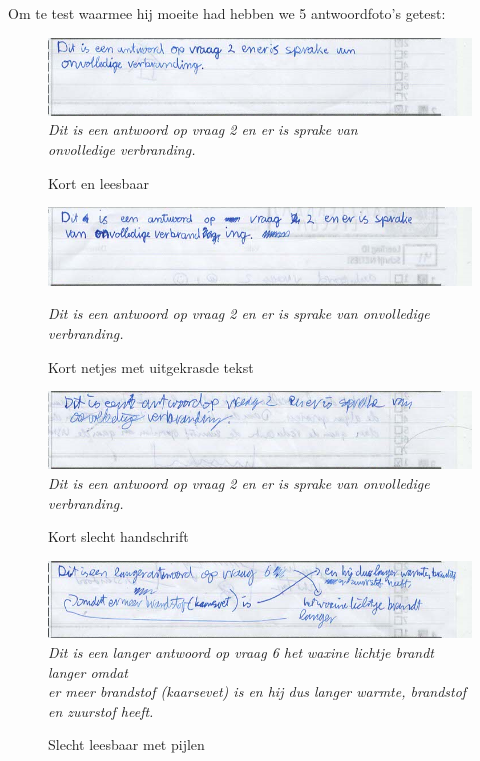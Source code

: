 \documentclass[12pt]{article}
\begin{document}
\begin{multicols}{2}
Om te test waarmee hij moeite had hebben we 5 antwoordfoto's getest:
\begin{figure}[H]
    \centering
    \includegraphics[width=1\linewidth]{./images/methoden/inscannen/tekst/kort_leesbaar.png}
    \textit{Dit is een antwoord op vraag 2 en er is sprake van\\
onvolledige verbranding.}
    \caption{Kort en leesbaar}
    \label{fig:enter-label}
\end{figure}
\begin{figure}[H]
    \centering
    \includegraphics[width=1\linewidth]{./images/methoden/inscannen/tekst/kort_leesbaar_uitgekrast.png}

    \textit{Dit is een antwoord op vraag 2 en er is sprake van onvolledige verbranding.}
    \caption{Kort netjes met uitgekrasde tekst}

    \label{fig:enter-label}
\end{figure}
\begin{figure}[H]
    \centering
    \includegraphics[width=1\linewidth]{./images/methoden/inscannen/tekst/kort_onleesbaar.png}
    \textit{Dit is een antwoord op vraag 2 en er is sprake van onvolledige verbranding.}
    \caption{Kort slecht handschrift}

    \label{fig:enter-label}
\end{figure}
\begin{figure}[H]
    \centering
    \includegraphics[width=1\linewidth]{./images/methoden/inscannen/tekst/slecht_leesbaar_pijlen.png}
    \textit{Dit is een langer antwoord op vraag 6 het waxine lichtje brandt langer omdat \\
er meer brandstof (kaarsevet) is en hij dus langer warmte, brandstof en zuurstof heeft.}
    \caption{Slecht leesbaar met pijlen}


\end{figure}
\end{multicols}
\end{document}
